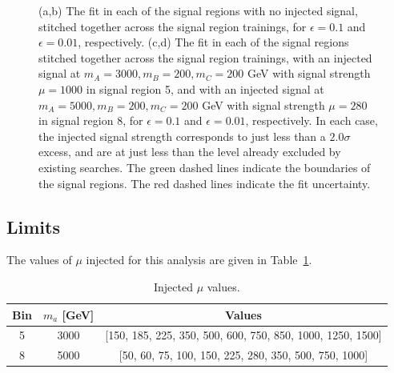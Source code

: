 \begin{figure}[h!]
\caption{(a,b) The fit in each of the signal regions with no injected signal, stitched together across the signal region trainings, for $\epsilon=0.1$ and $\epsilon=0.01$, respectively.
  (c,d) The fit in each of the signal regions stitched together across the signal region trainings, with an injected signal at $m_A=3000,m_B=200,m_C=200$ GeV with signal strength $\mu=1000$ in signal region 5, and with an injected signal at $m_A=5000,m_B=200,m_C=200$ GeV with signal strength $\mu=280$ in signal region 8, for $\epsilon=0.1$ and $\epsilon=0.01$, respectively.
  In each case, the injected signal strength corresponds to just less than a $2.0\sigma$ excess, and are at just less than the level already excluded by existing searches.
  The green dashed lines indicate the boundaries of the signal regions.
  The red dashed lines indicate the fit uncertainty.}
\label{fig:CWoLa:unblinded:stitched_fits}
\end{figure}

\FloatBarrier
\subsection{Limits}
\label{sec:CWoLa:unblinded:limits}

The values of $\mu$ injected for this analysis are given in Table~\ref{tab:unblinded:injectedmu}.
\begin{table}[htb]
  \centering
  \caption{Injected $\mu$ values.}
  \label{tab:unblinded:injectedmu}
  \begin{tabular}{c c c}
    \hline
    Bin & $m_a$ [GeV] & Values \\ \hline
    5 & 3000 & [150, 185, 225, 350, 500, 600, 750, 850, 1000, 1250, 1500] \\
    8 & 5000 & [50, 60, 75, 100, 150, 225, 280, 350, 500, 750, 1000] \\
    \hline
  \end{tabular}
\end{table} 

